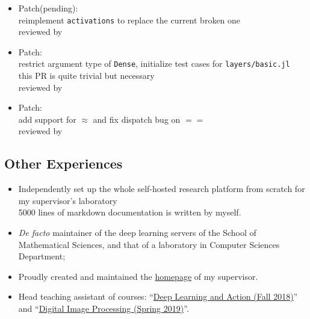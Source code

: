 \begin{itemize}
{      not yet reviewed because all active maintainers are busy lately
      }
    \item Patch(pending): \\
      {\small
      reimplement \texttt{activations} to replace the current broken one\\
      reviewed by \mikeinnes
      }
    \item Patch: \\
      {\small
      restrict argument type of \texttt{Dense}, initialize test cases for \texttt{layers/basic.jl}\\
      this PR is quite trivial but necessary\\
      reviewed by \mikeinnes
      }
    \item Patch: \\
      {\small
      add support for \textsf{$\approx$} and fix dispatch bug on \textsf{$==$} \\
      reviewed by \mikeinnes
      }
\end{itemize}

\subsection*{Other Experiences}
  \begin{itemize}
      \item Independently set up the whole self-hosted research platform from scratch for my supervisor's laboratory\\
        {\small
        5000 lines of markdown documentation is written by myself.
        }
      \item \textit{De facto} maintainer of the deep learning servers of the School of Mathematical Sciences, and that of a laboratory in Computer Sciences Department;
      \item Proudly created and maintained the \href{http://math.ecnu.edu.cn/~fli/}{homepage} of my supervisor.
      \item Head teaching assistant of courses: ``\href{http://math.ecnu.edu.cn/~fli/Teaching/DeepLearning/Fall2018/index.html}{Deep Learning and Action (Fall 2018)}''  and ``\href{http://math.ecnu.edu.cn/~fli/Teaching/DigitalImageProcessing/Spring2019/index.html}{Digital Image Processing (Spring 2019)}''.
  \end{itemize}


